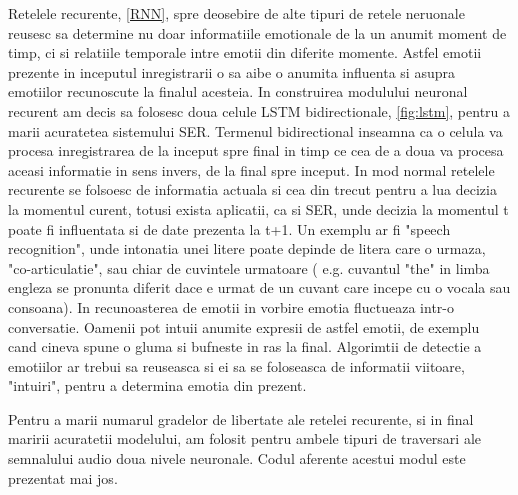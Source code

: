 \documentclass[a4paper,12pt]{book}
\begin{document}
				Retelele recurente, \ref{RNN}, spre deosebire de alte tipuri de retele neruonale reusesc sa determine nu doar informatiile emotionale de la un anumit moment de timp, ci si relatiile temporale intre emotii din diferite momente. Astfel emotii prezente in inceputul inregistrarii o sa aibe o anumita influenta si asupra emotiilor recunoscute la finalul acesteia. In construirea modulului neuronal recurent am decis sa folosesc doua celule LSTM bidirectionale, \ref{fig:lstm}, pentru a marii acuratetea sistemului SER. Termenul bidirectional inseamna ca o celula va procesa inregistrarea de la inceput spre final in timp ce cea de a doua va procesa aceasi informatie in sens invers, de la final spre inceput. In mod normal retelele recurente se folsoesc de informatia actuala si cea din trecut pentru a lua decizia la momentul curent, totusi exista aplicatii, ca si SER, unde decizia la momentul t poate fi influentata si de date prezenta la t+1. Un exemplu ar fi "speech recognition", unde intonatia unei litere poate depinde de litera care o urmaza, "co-articulatie", sau chiar de cuvintele urmatoare ( e.g. cuvantul "the" in limba engleza se pronunta diferit dace e urmat de un cuvant care incepe cu o vocala sau consoana). In recunoasterea de emotii in vorbire emotia fluctueaza intr-o conversatie. Oamenii pot intuii anumite expresii de astfel emotii, de exemplu cand cineva spune o gluma si bufneste in ras la final. Algorimtii de detectie a emotiilor ar trebui sa reuseasca si ei sa se foloseasca de informatii viitoare, "intuiri", pentru a determina emotia din prezent. \par
				Pentru a marii numarul gradelor de libertate ale retelei recurente, si in final maririi acuratetii modelului, am folosit pentru ambele tipuri de traversari ale semnalului audio doua nivele neuronale. Codul aferente acestui modul este prezentat mai jos.\par
\end{document}
